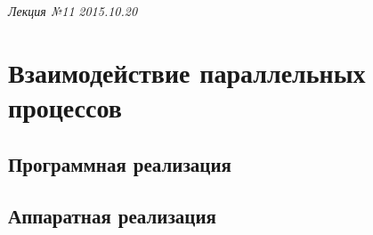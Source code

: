 \clearpage
\begin{flushright}
	\textit{Лекция №11}
	\textit{2015.10.20}
\end{flushright}

\chapter{Взаимодействие параллельных процессов}

\section{Программная реализация}

\section{Аппаратная реализация}


